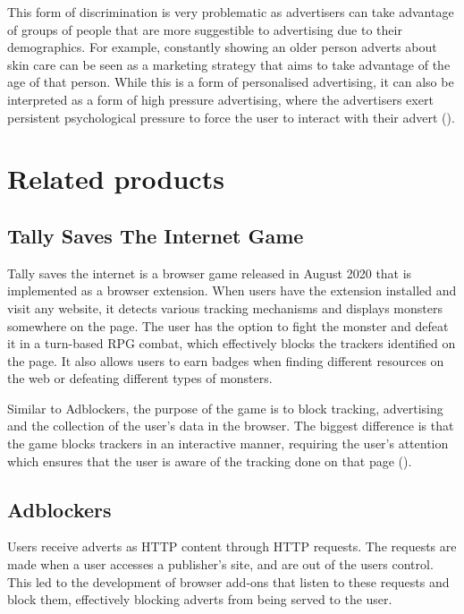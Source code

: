 \documentclass{l4proj}
\begin{document}
This form of discrimination is very problematic as advertisers can take advantage of groups of people that are more suggestible to advertising due to their demographics. For example, constantly showing an older person adverts about skin care can be seen as a marketing strategy that aims to take advantage of the age of that person. While this is a form of personalised advertising, it can also be interpreted as a form of  high pressure advertising, where the advertisers exert persistent psychological pressure to force the user to interact with their advert (\cite{fennis2015psychology}).


\section{Related products}
\subsection{Tally Saves The Internet Game}
Tally saves the internet is a browser game released in August 2020 that is implemented as a browser extension. When users have the extension installed and visit any website, it detects various tracking mechanisms and displays monsters somewhere on the page. The user has the option to fight the monster and defeat it in a turn-based RPG combat, which effectively blocks the trackers identified on the page. It also allows users to earn badges when finding different resources on the web or defeating different types of monsters.

Similar to Adblockers, the purpose of the game is to block tracking, advertising and the collection of the user's data in the browser. The biggest difference is that the game blocks trackers in an interactive manner, requiring the user's attention which ensures that the user is aware of the tracking done on that page (\cite{tally}). 

\subsection{Adblockers}
Users receive adverts as HTTP content through HTTP requests. The requests are made when a user accesses a publisher's site, and are out of the users control. This led to the development of browser add-ons that listen to these requests and block them, effectively blocking adverts from being served to the user. 
\end{document}
